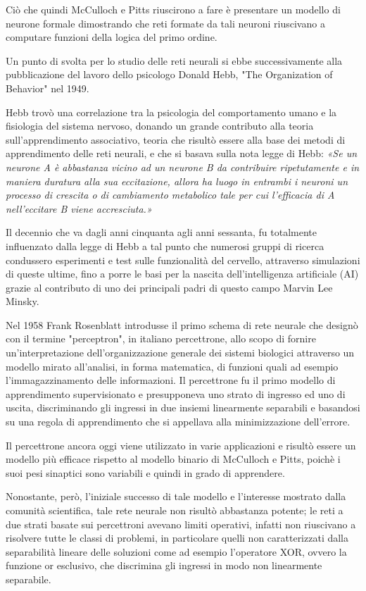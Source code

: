 \documentclass[12pt,a4paper,oneside]{book}
\begin{document}
	    Ciò che quindi McCulloch e Pitts riuscirono a fare è presentare un modello di neurone formale dimostrando che reti formate da tali neuroni riuscivano a computare funzioni della logica del primo ordine.
	    
	    Un punto di svolta per lo studio delle reti neurali si ebbe successivamente alla pubblicazione del lavoro dello psicologo Donald Hebb, "The Organization of Behavior" nel 1949.
	     
	    Hebb trovò una correlazione tra la psicologia del comportamento umano e la fisiologia del sistema nervoso, donando un grande contributo alla teoria sull'apprendimento associativo, teoria che risultò essere alla base dei metodi di apprendimento delle reti neurali, e che si basava sulla nota legge di Hebb: \textit{«Se un neurone A è abbastanza vicino ad un neurone B da contribuire ripetutamente e in maniera duratura alla sua eccitazione, allora ha luogo in entrambi i neuroni un processo di crescita o di cambiamento metabolico tale per cui l'efficacia di A nell'eccitare B viene accresciuta.»}
	    
	    Il decennio che va dagli anni cinquanta agli anni sessanta, fu totalmente influenzato dalla legge di Hebb a tal punto che numerosi gruppi di ricerca condussero esperimenti e test sulle funzionalità del cervello, attraverso simulazioni di queste ultime, fino a porre le basi per la nascita dell'intelligenza artificiale (AI) grazie al contributo di uno dei principali padri di questo campo Marvin Lee Minsky.
	
		Nel 1958 Frank Rosenblatt introdusse il primo schema di rete neurale che designò con il termine "perceptron", in italiano percettrone, allo scopo di fornire un'interpretazione dell'organizzazione generale dei sistemi biologici attraverso un modello mirato all'analisi, in forma matematica, di funzioni quali ad esempio l'immagazzinamento delle informazioni. Il percettrone fu il primo modello di apprendimento supervisionato e presupponeva uno strato di ingresso ed uno di uscita, discriminando gli ingressi in due insiemi linearmente separabili e basandosi su una regola di apprendimento che si appellava alla minimizzazione dell'errore.
		
		Il percettrone ancora oggi viene utilizzato in varie applicazioni e risultò essere un modello più efficace rispetto al modello binario di McCulloch e Pitts, poichè i suoi pesi sinaptici sono variabili e quindi in grado di apprendere.
		
		Nonostante, però, l'iniziale successo di tale modello e l'interesse mostrato dalla comunità scientifica, tale rete neurale non risultò abbastanza potente; le reti a due strati basate sui percettroni avevano limiti operativi, infatti non riuscivano a risolvere tutte le classi di problemi, in particolare quelli non caratterizzati dalla separabilità lineare delle soluzioni come ad esempio l'operatore XOR, ovvero la funzione or esclusivo, che discrimina gli ingressi in modo non linearmente separabile.
		
\end{document}
